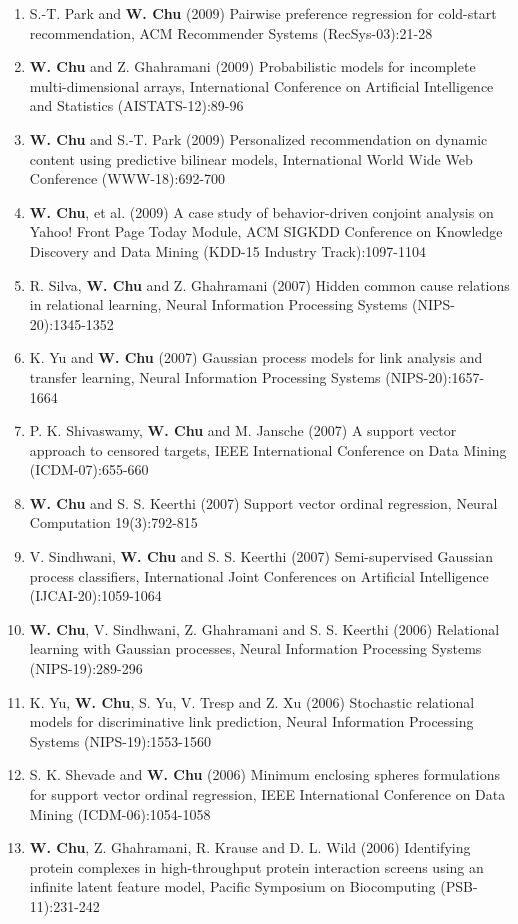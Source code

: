 \documentclass[line,10pt,final]{res}
\begin{document}
\begin{resume}
\begin{enumerate}
\item S.-T. Park and  {\bf W. Chu} (2009) Pairwise preference regression for cold-start recommendation, ACM Recommender Systems (RecSys-03):21-28  
\item  {\bf W. Chu} and Z. Ghahramani (2009) Probabilistic models for incomplete multi-dimensional arrays, International Conference on Artificial Intelligence and Statistics (AISTATS-12):89-96  
\item  {\bf W. Chu} and S.-T. Park (2009) Personalized recommendation on dynamic content using predictive bilinear models, International World Wide Web Conference (WWW-18):692-700  
\item  {\bf W. Chu}, et al. (2009) A case study of behavior-driven conjoint analysis on Yahoo! Front Page Today Module, ACM SIGKDD Conference on Knowledge Discovery and Data Mining (KDD-15 Industry Track):1097-1104  
\item R. Silva,  {\bf W. Chu} and Z. Ghahramani (2007) Hidden common cause relations in relational learning, Neural Information Processing Systems (NIPS-20):1345-1352  
\item K. Yu and  {\bf W. Chu} (2007) Gaussian process models for link analysis and transfer learning, Neural Information Processing Systems (NIPS-20):1657-1664  
\item P. K. Shivaswamy,  {\bf W. Chu} and M. Jansche (2007) A support vector approach to censored targets, IEEE International Conference on Data Mining (ICDM-07):655-660  
\item  {\bf W. Chu} and S. S. Keerthi (2007)  Support vector ordinal regression,  Neural Computation 19(3):792-815  
\item V. Sindhwani,  {\bf W. Chu} and S. S. Keerthi (2007) Semi-supervised Gaussian process classifiers, International Joint Conferences on Artificial Intelligence (IJCAI-20):1059-1064  
\item  {\bf W. Chu}, V. Sindhwani, Z. Ghahramani and S. S. Keerthi (2006) Relational learning with Gaussian processes, Neural Information Processing Systems (NIPS-19):289-296  
\item K. Yu,  {\bf W. Chu}, S. Yu, V. Tresp and Z. Xu (2006) Stochastic relational models for discriminative link prediction, Neural Information Processing Systems (NIPS-19):1553-1560  
\item S. K. Shevade and  {\bf W. Chu} (2006) Minimum enclosing spheres formulations for support vector ordinal regression, IEEE International Conference on Data Mining (ICDM-06):1054-1058  
\item  {\bf W. Chu}, Z. Ghahramani, R. Krause and D. L. Wild  (2006)  Identifying protein complexes in high-throughput protein interaction screens using an infinite latent feature model, Pacific Symposium on Biocomputing (PSB-11):231-242  

\end{enumerate}
\end{resume}
\end{document}
